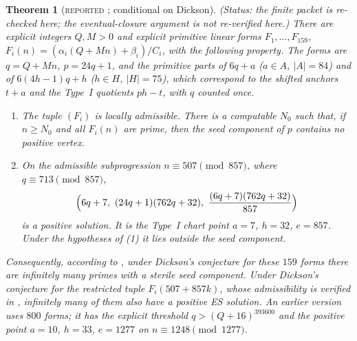 \documentclass[11pt,reqno]{amsart}
\newtheorem{theorem}{Theorem}[section]
\theoremstyle{definition}
\newcommand{\status}[1]{\textsc{#1}}
\begin{document}
\begin{theorem}[\status{reported} \cite{AS}; conditional on Dickson]\label{thm:astra}
\emph{(Status: the finite packet is re-checked here; the eventual-closure
argument is not re-verified here.)}
There are explicit integers $Q,M>0$ and explicit primitive linear forms
$F_1,\dots,F_{159}$, $F_i(n)=(\alpha_i(Q+Mn)+\beta_i)/C_i$, with the
following property.  The forms
are $q=Q+Mn$, $p=24q+1$, and the primitive parts of $6q+a$ ($a\in A$,
$|A|=84$) and of $6(4h-1)q+h$ ($h\in H$, $|H|=75$), which correspond to the
shifted anchors $t+a$ and the Type~I quotients $ph-t$, with $q$ counted once.
\begin{enumerate}
\item The tuple $(F_i)$ is locally admissible.  There is a computable $N_0$
such that, if $n\ge N_0$ and all $F_i(n)$ are prime, then the seed component
of $p$ contains no positive vertex.
\item On the admissible subprogression $n\equiv507\pmod{857}$, where
$q\equiv713\pmod{857}$,
\[
 \Bigl(6q+7,\ (24q+1)(762q+32),\ \frac{(6q+7)(762q+32)}{857}\Bigr)
\]
is a positive solution.  It is the Type~I chart point $a=7$, $h=32$, $e=857$.
Under the hypotheses of (1) it lies outside the seed component.
\end{enumerate}
Consequently, according to \cite{AS}, under Dickson's conjecture for these
$159$ forms there are infinitely many primes with a sterile seed component.  Under Dickson's
conjecture for the restricted tuple $F_i(507+857k)$, whose admissibility is
verified in \cite{AS}, infinitely many of them also have a positive ES
solution.  An earlier version uses $800$ forms; it has the explicit
threshold $q>(Q+16)^{393600}$ and the positive point $a=10$, $h=33$,
$e=1277$ on $n\equiv1248\pmod{1277}$.
\end{theorem}
\end{document}
